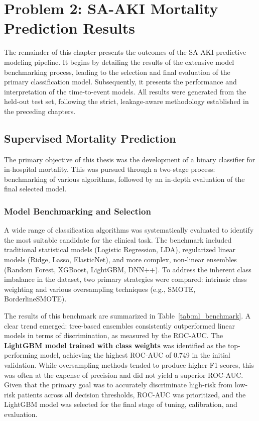 \section{Problem 2: SA-AKI Mortality Prediction Results}\label{sec:p2:results}
The remainder of this chapter presents the outcomes of the SA-AKI predictive modeling pipeline. It begins by detailing the results of the extensive model benchmarking process, leading to the selection and final evaluation of the primary classification model. Subsequently, it presents the performance and interpretation of the time-to-event models. All results were generated from the held-out test set, following the strict, leakage-aware methodology established in the preceding chapters.

\subsection{Supervised Mortality Prediction}
The primary objective of this thesis was the development of a binary classifier for in-hospital mortality. This was pursued through a two-stage process: benchmarking of various algorithms, followed by an in-depth evaluation of the final selected model.

\subsubsection{Model Benchmarking and Selection}
A wide range of classification algorithms was systematically evaluated to identify the most suitable candidate for the clinical task. The benchmark included traditional statistical models (Logistic Regression, LDA), regularized linear models (Ridge, Lasso, ElasticNet), and more complex, non-linear ensembles (Random Forest, XGBoost, LightGBM, DNN++). To address the inherent class imbalance in the dataset, two primary strategies were compared: intrinsic class weighting and various oversampling techniques (e.g., SMOTE, BorderlineSMOTE).

The results of this benchmark are summarized in Table~\ref{tab:ml_benchmark}. A clear trend emerged: tree-based ensembles consistently outperformed linear models in terms of discrimination, as measured by the ROC-AUC. The \textbf{LightGBM model trained with class weights} was identified as the top-performing model, achieving the highest ROC-AUC of 0.749 in the initial validation. While oversampling methods tended to produce higher F1-scores, this was often at the expense of precision and did not yield a superior ROC-AUC. Given that the primary goal was to accurately discriminate high-risk from low-risk patients across all decision thresholds, ROC-AUC was prioritized, and the LightGBM model was selected for the final stage of tuning, calibration, and evaluation.

